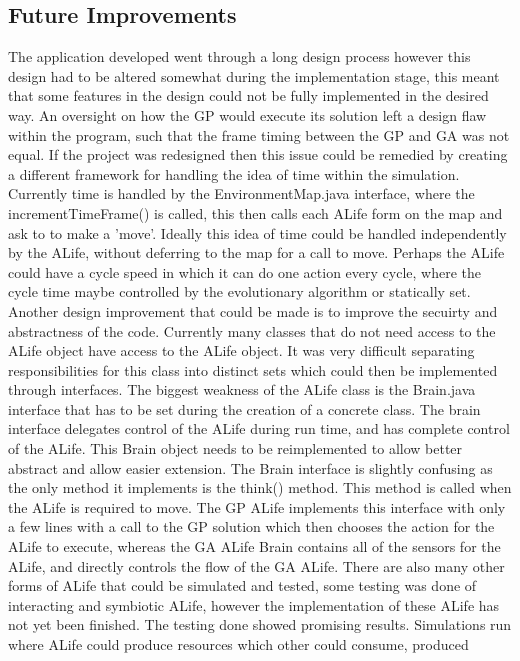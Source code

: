 \documentclass[12pt]{article}
\begin{document}
\subsection{Future Improvements}
The application developed went through a long design process however this design had to be altered somewhat during the implementation stage, this meant that some
features in the design could not be fully implemented in the desired way. An oversight on how the GP would execute its solution left a design flaw within the program,
such that the frame timing between the GP and GA was not equal. If the project was redesigned then this issue could be remedied by creating a different framework for
handling the idea of time within the simulation. Currently time is handled by the EnvironmentMap.java interface, where the incrementTimeFrame() is called, this then
calls each ALife form on the map and ask to to make a 'move'. Ideally this idea of time could be handled independently by the ALife, without deferring to the map for
a call to move. Perhaps the ALife could have a cycle speed in which it can do one action every cycle, where the cycle time maybe controlled by the evolutionary algorithm
or statically set. 
Another design improvement that could be made is to improve the secuirty and abstractness of the code. Currently many classes that do not need access to the ALife
object have access to the ALife object. It was very difficult separating responsibilities for this class into distinct sets which could then be implemented through
interfaces. The biggest weakness of the ALife class is the Brain.java interface that has to be set during the creation of a concrete class. The brain interface
delegates control of the ALife during run time, and has complete control of the ALife. This Brain object needs to be reimplemented to allow better abstract and allow
easier extension. The Brain interface is slightly confusing as the only method it implements is the think() method. This method is called when the ALife is required to
move. The GP ALife implements this interface with only a few lines with a call to the GP solution which then chooses the action for the ALife to execute, whereas the
GA ALife Brain contains all of the sensors for the ALife, and directly controls the flow of the GA ALife.
There are also many other forms of ALife that could be simulated and tested, some testing was done of interacting and symbiotic ALife, however the implementation of
these ALife has not yet been finished. The testing done showed promising results. Simulations run where ALife could produce resources which other could consume, produced
\end{document}
